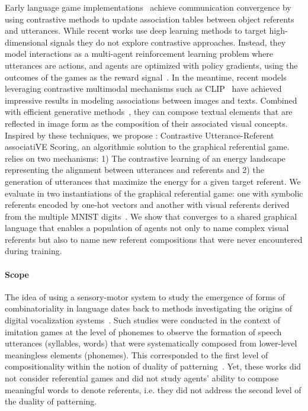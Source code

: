 Early language game implementations~\citep{steels1995selforganizing,steels2001language} achieve communication convergence by using contrastive methods to update association tables between object referents and utterances. While recent works use deep learning methods to target high-dimensional signals they do not explore contrastive approaches. Instead, they model interactions as a multi-agent reinforcement learning problem where utterances are actions, and agents are optimized with policy gradients, using the outcomes of the games as the reward signal~\citep{lazaridou2017multiagent}. In the meantime, recent models leveraging contrastive multimodal mechanisms such as CLIP~\citep{radford2021learning} have achieved impressive results in modeling associations between images and texts. Combined with efficient generative methods~\citep{ramesh2021zero-shot}, they can compose textual elements that are reflected in image form as the composition of their associated visual concepts. Inspired by these techniques, we propose \curves: Contrastive Utterance-Referent associatiVE Scoring, an algorithmic solution to the graphical referential game. \curves relies on two mechanisms: 1) The contrastive learning of an energy landscape representing the alignment between utterances and referents and 2) the generation of utterances that maximize the energy for a given target referent. We evaluate \curves in two instantiations of the graphical referential game: one with symbolic referents encoded by one-hot vectors and another with visual referents derived from the multiple MNIST digits~\citep{LeCun1998GradientbasedLA}. We show that \curves converges to a shared graphical language that enables a population of agents not only to name complex visual referents but also to name new referent compositions that were never encountered during training.

\paragraph{Scope}

 The idea of using a sensory-motor system to study the emergence of forms of combinatoriality in language dates back to methods investigating the origins of digital vocalization systems~\citep{deBoer2000selforganization,oudeyer2005selforganization,zuidema2009evolution}. Such studies were conducted in the context of imitation games at the level of phonemes to observe the formation of speech utterances (syllables, words) that were systematically composed from lower-level meaningless elements (phonemes). This corresponded to the first level of compositionality within the notion of duality of patterning~\citep{hockett1960origin}. Yet, these works did not consider referential games and did not study agents' ability to compose meaningful words to denote referents, i.e. they did not address the second level of the duality of patterning. 

